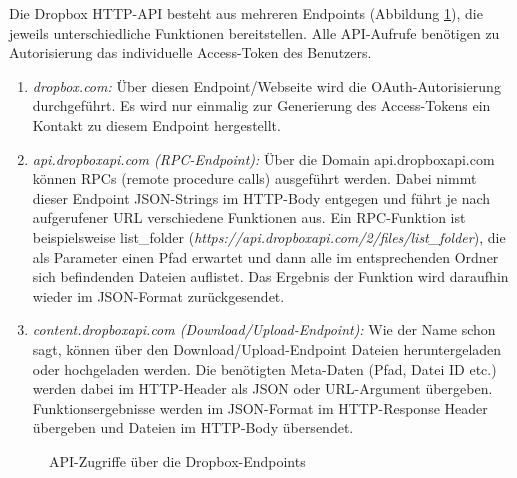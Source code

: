 Die Dropbox HTTP-API besteht aus mehreren Endpoints (Abbildung \ref{04ergebnis:dpendpoints}), die jeweils unterschiedliche Funktionen bereitstellen. Alle API-Aufrufe benötigen zu Autorisierung das individuelle Access-Token des Benutzers.

\begin{enumerate}
	\item \textit{dropbox.com:} Über diesen Endpoint/Webseite wird die OAuth-Autorisierung durchgeführt. Es wird nur einmalig zur Generierung des Access-Tokens ein Kontakt zu diesem Endpoint hergestellt.
	
	\item \textit{api.dropboxapi.com (RPC-Endpoint):}  Über die Domain api.dropboxapi.com können RPCs (remote procedure calls) ausgeführt werden. Dabei nimmt dieser Endpoint JSON-Strings im HTTP-Body entgegen und führt je nach aufgerufener URL verschiedene Funktionen aus. Ein RPC-Funktion ist beispielsweise list\_{folder} (\textit{https://api.dropboxapi.com/2/files/list\_{folder}}), die als Parameter einen Pfad erwartet und dann alle im entsprechenden Ordner sich
 befindenden Dateien auflistet. Das Ergebnis der Funktion wird daraufhin wieder im JSON-Format zurückgesendet.
 
 	\item \textit{content.dropboxapi.com (Download/Upload-Endpoint):} Wie der Name schon sagt, können über den Download/Upload-Endpoint Dateien heruntergeladen oder hochgeladen werden. Die benötigten Meta-Daten (Pfad, Datei ID etc.) werden dabei im HTTP-Header als JSON oder URL-Argument übergeben. Funktionsergebnisse werden im JSON-Format im HTTP-Response Header übergeben und Dateien im HTTP-Body übersendet.
\end{enumerate}

\begin{figure}[H]
\centering
	\scalebox{0.5}{}
	\caption{API-Zugriffe über die Dropbox-Endpoints}
	\label{04ergebnis:dpendpoints}	
\end{figure}

